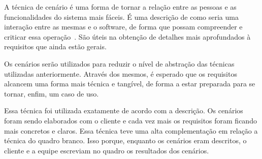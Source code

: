 A técnica de cenário é uma forma de tornar a relação entre as pessoas e as funcionalidades do sistema mais fáceis. É uma descrição de como seria uma interação entre as mesmas e o software, de forma que possam compreender e criticar essa operação~\cite{sommerville}. São úteis na obtenção de detalhes mais aprofundados à requisitos que ainda estão gerais.

Os cenários serão utilizados para reduzir o nível de abstração das técnicas utilizadas anteriormente. Através dos mesmos, é esperado que os requisitos alcancem uma forma mais técnica e tangível, de forma a estar preparada para se tornar, enfim, um caso de uso.

Essa técnica foi utilizada exatamente de acordo com a descrição. Os cenários foram sendo elaborados com o cliente e cada vez mais os requisitos foram ficando mais concretos e claros. Essa técnica teve uma alta complementação em relação a técnica do quadro branco. Isso porque, enquanto os cenários eram descritos, o cliente e a equipe escreviam no quadro os resultados dos cenários. 
